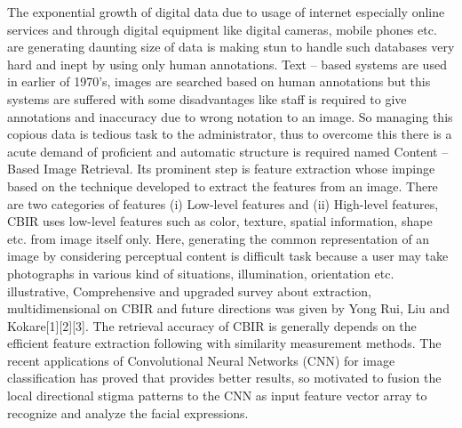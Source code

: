 The exponential growth of digital data due to usage of internet especially online services and through digital equipment like digital cameras, mobile phones etc. are generating daunting size of data is making stun to handle such databases very hard and inept by using only human annotations. Text – based systems are used in earlier of 1970’s, images are searched based on human annotations but this systems are suffered with some disadvantages like staff is required to give annotations and inaccuracy due to wrong notation to an image.  So managing this copious data is tedious task to the administrator, thus to overcome this there is a acute demand of proficient and automatic structure is required named Content – Based Image Retrieval. Its prominent step is feature extraction whose impinge based on the technique developed to extract the features from an image. There are two categories of features (i) Low-level features and (ii) High-level features, CBIR uses low-level features such as color, texture, spatial information, shape etc. from image itself only. Here, generating the common representation of an image by considering perceptual content is difficult task because a user may take photographs in various kind of situations, illumination, orientation etc. illustrative, Comprehensive and upgraded survey about extraction, multidimensional on CBIR and future directions was given by Yong Rui, Liu and Kokare[1][2][3]. The retrieval accuracy of CBIR is generally depends on the efficient feature extraction following with similarity measurement methods. The recent applications of Convolutional Neural Networks (CNN) for image classification has proved that provides better results, so motivated to fusion the local directional stigma patterns to the CNN as input feature vector array to recognize and analyze the facial expressions.  

